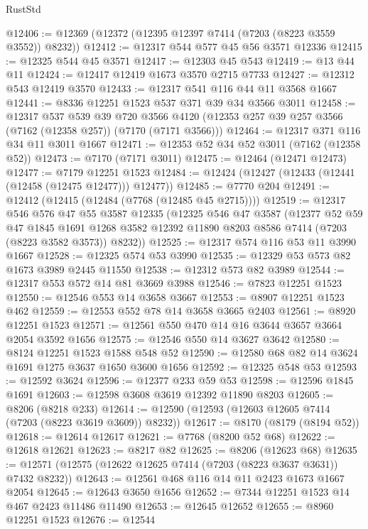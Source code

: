 \begin{lexlean}{RustStd}
\begin{coremodule}
@12406 := @12369 (@12372 (@12395 @12397 @7414 (@7203 (@8223 @3559 @3552)) @8232))
@12412 := @12317 @544 @577 @45 @56 @3571 @12336
@12415 := @12325 @544 @45 @3571
@12417 := @12303 @45 @543
@12419 := @13 @44 @11
@12424 := @12417 @12419 @1673 @3570 @2715 @7733
@12427 := @12312 @543 @12419 @3570
@12433 := @12317 @541 @116 @44 @11 @3568 @1667
@12441 := @8336 @12251 @1523 @537 @371 @39 @34 @3566 @3011
@12458 := @12317
    @537
    @539
    @39
    @720
    @3566
    @4120
    (@12353 @257 @39 @257 @3566 (@7162 (@12358 @257)) (@7170 (@7171 @3566)))
@12464 := @12317 @371 @116 @34 @11 @3011 @1667
@12471 := @12353 @52 @34 @52 @3011 (@7162 (@12358 @52))
@12473 := @7170 (@7171 @3011)
@12475 := @12464 (@12471 @12473)
@12477 := @7179 @12251 @1523
@12484 := @12424 (@12427 (@12433 (@12441 (@12458 (@12475 @12477))) @12477))
@12485 := @7770 @204
@12491 := @12412 (@12415 (@12484 (@7768 (@12485 @45 @2715))))
@12519 := @12317
    @546
    @576
    @47
    @55
    @3587
    @12335
    (@12325
      @546
      @47
      @3587
      (@12377
        @52
        @59
        @47
        @1845
        @1691
        @1268
        @3582
        @12392
        @11890
        @8203
        @8586
        @7414
        (@7203 (@8223 @3582 @3573))
        @8232))
@12525 := @12317 @574 @116 @53 @11 @3990 @1667
@12528 := @12325 @574 @53 @3990
@12535 := @12329 @53 @573 @82 @1673 @3989 @2445 @11550
@12538 := @12312 @573 @82 @3989
@12544 := @12317 @553 @572 @14 @81 @3669 @3988
@12546 := @7823 @12251 @1523
@12550 := @12546 @553 @14 @3658 @3667
@12553 := @8907 @12251 @1523 @462
@12559 := @12553 @552 @78 @14 @3658 @3665 @2403
@12561 := @8920 @12251 @1523
@12571 := @12561 @550 @470 @14 @16 @3644 @3657 @3664 @2054 @3592 @1656
@12575 := @12546 @550 @14 @3627 @3642
@12580 := @8124 @12251 @1523 @1588 @548 @52
@12590 := @12580 @68 @82 @14 @3624 @1691 @1275 @3637 @1650 @3600 @1656
@12592 := @12325 @548 @53
@12593 := @12592 @3624
@12596 := @12377 @233 @59 @53
@12598 := @12596 @1845 @1691
@12603 := @12598 @3608 @3619 @12392 @11890 @8203
@12605 := @8206 (@8218 @233)
@12614 := @12590 (@12593 (@12603 @12605 @7414 (@7203 (@8223 @3619 @3609)) @8232))
@12617 := @8170 (@8179 (@8194 @52))
@12618 := @12614 @12617
@12621 := @7768 (@8200 @52 @68)
@12622 := @12618 @12621
@12623 := @8217 @82
@12625 := @8206 (@12623 @68)
@12635 := @12571 (@12575 (@12622 @12625 @7414 (@7203 (@8223 @3637 @3631)) @7432 @8232))
@12643 := @12561 @468 @116 @14 @11 @2423 @1673 @1667 @2054
@12645 := @12643 @3650 @1656
@12652 := @7344 @12251 @1523 @14 @467 @2423 @11486 @11490
@12653 := @12645 @12652
@12655 := @8960 @12251 @1523
@12676 := @12544

\end{coremodule}
\end{lexlean}
